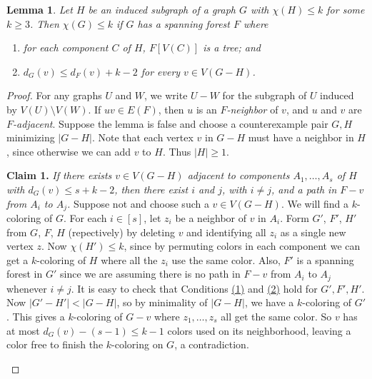\documentclass[12pt]{article}
\theoremstyle{plain}
\newtheorem*{Lemma}{Lemma}
\theoremstyle{definition}
\theoremstyle{remark}
\newcommand{\card}[1]{\left|#1\right|}
\newcommand{\irange}[1]{\left[#1\right]}
\newcommand{\brackets}[1]{\left[ #1 \right]}
\begin{document}
\begin{Lemma}
\label{stiebitz}
Let $H$ be an induced subgraph of a graph $G$ with $\chi(H) \le k$ for some $k \ge 3$.  Then $\chi(G) \le k$ if $G$ has a spanning forest $F$ where
\begin{enumerate}
\item for each component $C$ of $H$, $F\brackets{V(C)}$ is a tree; and
\label{cond1}
\item $d_G(v) \le d_F(v) + k-2$ for every $v \in V(G-H)$.
\label{cond2}
\end{enumerate}
\end{Lemma}
\begin{proof}
For any graphs $U$ and $W$, we write $U-W$ for the subgraph of $U$ induced by
$V(U)\setminus V(W)$.
If $uv\in E(F)$, then $u$ is an \emph{$F$-neighbor} of $v$, and $u$ and $v$ are
\emph{$F$-adjacent}.
Suppose the lemma is false and choose a counterexample pair $G, H$ minimizing
$|G-H|$.
Note that each vertex $v$ in $G-H$ must have a neighbor in $H$, since 
otherwise we can add $v$ to $H$.  Thus $\card{H}\ge 1$.

\textbf{Claim 1.} \textit{If there exists $v \in V(G-H)$ adjacent to
components $A_1, \ldots, A_s$ of $H$ with $d_G(v) \le s + k - 2$, then there
exist $i$ and $j$, with $i \ne j$, and a path in $F-v$ from $A_i$ to $A_j$.}
Suppose not and choose such a $v \in V(G-H)$.  
We will find a $k$-coloring of $G$.
For each $i \in \irange{s}$, let $z_i$ be a neighbor of $v$ in $A_i$.  Form
$G'$, $F'$, $H'$ from $G$, $F$, $H$ (repectively) by deleting $v$ and
identifying all $z_i$ as a single new vertex $z$.  
Now $\chi(H') \le k$, since by permuting colors in each component we can get
a $k$-coloring of $H$ where all the $z_i$ use the same color.  Also, $F'$ is a
spanning forest in $G'$ since we are assuming there is no path in $F-v$ from
$A_i$ to $A_j$ whenever $i \ne j$.  It is easy to check that Conditions 
\hyperref[cond1]{(1)} and \hyperref[cond2]{(2)} hold for $G', F', H'$.  Now
$|G'-H'|<|G-H|$, so by minimality of $|G-H|$,
we have a $k$-coloring of $G'$.  This gives a $k$-coloring of $G-v$ where $z_1,
\ldots, z_s$ all get the same color.  So $v$ has at most $d_G(v) - (s-1) \le
k-1$ colors used on its neighborhood, leaving a color free to finish the
$k$-coloring on $G$, a contradiction.

\begin{center}
\begin{figure}

\end{figure}
\end{center}
\end{proof}
\end{document}
